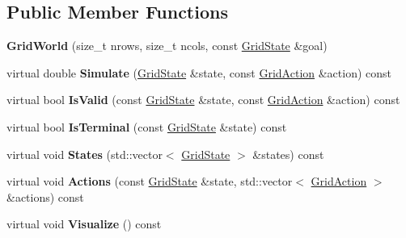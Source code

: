 \subsection*{Public Member Functions}
\begin{DoxyCompactItemize}
\item 
\hypertarget{classrl_1_1_grid_world_a5b67dffbc875e7c3bbc0ad777fd3f4bf}{}\label{classrl_1_1_grid_world_a5b67dffbc875e7c3bbc0ad777fd3f4bf} 
{\bfseries Grid\+World} (size\+\_\+t nrows, size\+\_\+t ncols, const \hyperlink{structrl_1_1_grid_state}{Grid\+State} \&goal)
\item 
\hypertarget{classrl_1_1_grid_world_a158de44c9973c96999db6984ff32142c}{}\label{classrl_1_1_grid_world_a158de44c9973c96999db6984ff32142c} 
virtual double {\bfseries Simulate} (\hyperlink{structrl_1_1_grid_state}{Grid\+State} \&state, const \hyperlink{structrl_1_1_grid_action}{Grid\+Action} \&action) const
\item 
\hypertarget{classrl_1_1_grid_world_a0e9447b4096d21aa1df71d9b67ea6595}{}\label{classrl_1_1_grid_world_a0e9447b4096d21aa1df71d9b67ea6595} 
virtual bool {\bfseries Is\+Valid} (const \hyperlink{structrl_1_1_grid_state}{Grid\+State} \&state, const \hyperlink{structrl_1_1_grid_action}{Grid\+Action} \&action) const
\item 
\hypertarget{classrl_1_1_grid_world_a1aed08cf2f24961c8ca738dea101a7ed}{}\label{classrl_1_1_grid_world_a1aed08cf2f24961c8ca738dea101a7ed} 
virtual bool {\bfseries Is\+Terminal} (const \hyperlink{structrl_1_1_grid_state}{Grid\+State} \&state) const
\item 
\hypertarget{classrl_1_1_grid_world_a7ba442cfab266d2521750383e6cea98b}{}\label{classrl_1_1_grid_world_a7ba442cfab266d2521750383e6cea98b} 
virtual void {\bfseries States} (std\+::vector$<$ \hyperlink{structrl_1_1_grid_state}{Grid\+State} $>$ \&states) const
\item 
\hypertarget{classrl_1_1_grid_world_a510ef01ace9b62b77eef272dc62f67ae}{}\label{classrl_1_1_grid_world_a510ef01ace9b62b77eef272dc62f67ae} 
virtual void {\bfseries Actions} (const \hyperlink{structrl_1_1_grid_state}{Grid\+State} \&state, std\+::vector$<$ \hyperlink{structrl_1_1_grid_action}{Grid\+Action} $>$ \&actions) const
\item 
\hypertarget{classrl_1_1_grid_world_a38e94429ceff827a645410210aded137}{}\label{classrl_1_1_grid_world_a38e94429ceff827a645410210aded137} 
virtual void {\bfseries Visualize} () const
\end{DoxyCompactItemize}
